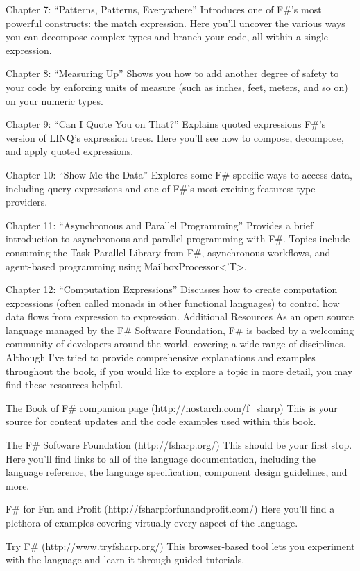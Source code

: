 \documentclass{book}
\begin{document}
Chapter 7: “Patterns, Patterns, Everywhere”  Introduces one of F\#’s most powerful constructs: the match expression. Here you’ll uncover the various ways you can decompose complex types and branch your code, all within a single expression.

Chapter 8: “Measuring Up”  Shows you how to add another degree of safety to your code by enforcing units of measure (such as inches, feet, meters, and so on) on your numeric types.

Chapter 9: “Can I Quote You on That?”  Explains quoted expressions F\#’s version of LINQ’s expression trees. Here you’ll see how to compose, decompose, and apply quoted expressions.

Chapter 10: “Show Me the Data”  Explores some F\#-specific ways to access data, including query expressions and one of F\#’s most exciting features: type providers.

Chapter 11: “Asynchronous and Parallel Programming”  Provides a brief introduction to asynchronous and parallel programming with F\#. Topics include consuming the Task Parallel Library from F\#, asynchronous workflows, and agent-based programming using MailboxProcessor<'T>.

Chapter 12: “Computation Expressions”  Discusses how to create computation expressions (often called monads in other functional languages) to control how data flows from expression to expression. Additional Resources As an open source language managed by the F\# Software Foundation, F\# is backed by a welcoming community of developers around the world, covering a wide range of disciplines. Although I’ve tried to provide comprehensive explanations and examples throughout the book, if you would like to explore a topic in more detail, you may find these resources helpful.

The Book of F\# companion page (http://nostarch.com/f\_sharp)  This is your source for content updates and the code examples used within this book.

The F\# Software Foundation (http://fsharp.org/)  This should be your first stop. Here you’ll find links to all of the language documentation, including the language reference, the language specification, component design guidelines, and more.

F\# for Fun and Profit (http://fsharpforfunandprofit.com/)  Here you’ll find a plethora of examples covering virtually every aspect of the language.

Try F\# (http://www.tryfsharp.org/)  This browser-based tool lets you experiment with the language and learn it through guided tutorials.
\end{document}
